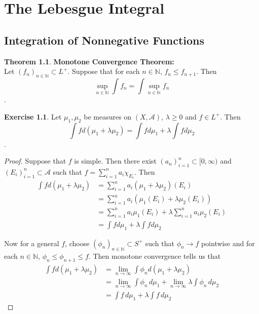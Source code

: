 \documentclass{book}
\theoremstyle{definition}
\newtheorem{thm}[definition]{Theorem}
\newtheorem{ex}[definition]{Exercise}
\newcommand{\lam}{\lambda}
\newcommand{\N}{\mathbb{N}}
\newcommand{\MA}{\mathcal{A}}
\newcommand{\lex}[1]{\label{ex:#1}}
\DeclareMathOperator*{\0}{\mbf{0}}
\DeclareMathOperator*{\1}{\mbf{1}}
\newcommand{\limn}{\lim \limits_{n \rightarrow \infty}}
\newcommand{\Rg}{[0,\infty)}
\newcommand{\dmu}{\, d \mu}
\begin{document}
	
	
	
	
	
	
	
	
	
	
	
	
	
	
	\newpage
	\chapter{The Lebesgue Integral}
	
	\section{Integration of Nonnegative Functions}
	
	\begin{thm}\textbf{Monotone Convergence Theorem:} \\
		Let $(f_n)_{n \in \N} \subset L^+$. Suppose that for each $n \in \N$, $f_n \leq f_{n+1}$. Then $$\sup_{n \in \N} \int f_n = \int \sup_{n \in \N} f_n$$.
	\end{thm}
	
	\begin{ex} \lex{00000} 
		Let $\mu_1, \mu_2$ be measures on $(X, \MA)$, $\lam \geq 0$ and $f \in L^+$. Then $$\int f d (\mu_1 + \lam \mu_2) = \int f d\mu_1 + \lam \int f d\mu_2$$.  
	\end{ex}
	
	\begin{proof}
		Suppose that $f$ is simple. Then there exist $(a_n)_{i=1}^n \subset \Rg$ and $(E_i)_{i=1}^n \subset \MA$ such that $f = \sum\limits_{i =1}^n a_i \chi_{E_i}$. Then 
		\begin{align*}
			\int f d(\mu_1 + \lam \mu_2) 
			&= \sum\limits_{i =1}^n a_i (\mu_1 + \lam \mu_2)(E_i)\\
			&= \sum\limits_{i =1}^n a_i (\mu_1(E_i) + \lam \mu_2(E_i))\\
			&= \sum\limits_{i =1}^n a_i \mu_1(E_i) + \lam \sum\limits_{i =1}^n a_i   \mu_2(E_i)\\
			&= \int f d\mu_1 + \lam \int f d\mu_2
		\end{align*}
		
		Now for a general $f$, choose $(\phi_n)_{n \in \N} \subset S^+$ such that $\phi_n \rightarrow f$ pointwise and for each $n \in \N$, $\phi_n \leq \phi_{n+1} \leq f$. Then monotone convergence tells us that 
		\begin{align*}
			\int f d(\mu_1 + \lam \mu_2) 
			&= \limn \int \phi_n d(\mu_1 + \lam \mu_2)\\
			&= \limn \int \phi_n \dmu_1 + \limn \lam \int \phi_n \dmu_2 \\
			&= \int f \dmu_1 +  \lam \int f \dmu_2
		\end{align*}
		
	\end{proof}
	
\end{document}

